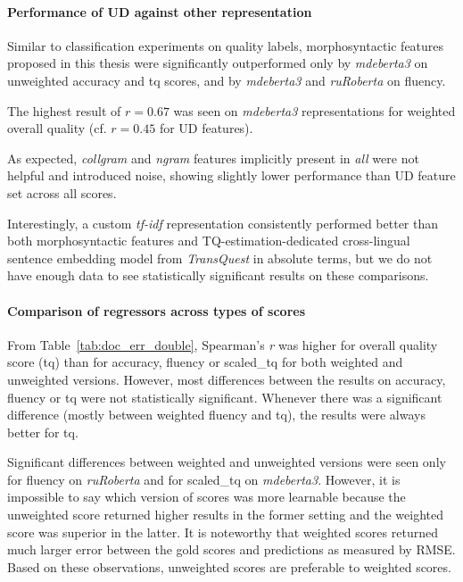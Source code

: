 \paragraph{\label{pg:doc_err_ud_vs_all}Performance of UD against other representation}
Similar to classification experiments on quality labels, morphosyntactic features proposed in this thesis were significantly outperformed only by \textit{mdeberta3} on unweighted accuracy and tq scores, and by \textit{mdeberta3} and \textit{ruRoberta} on fluency.

The highest result of $r=0.67$ was seen on \textit{mdeberta3} representations for weighted overall quality (cf. $r=0.45$ for UD features). %

As expected, \textit{collgram} and \textit{ngram} features implicitly present in \textit{all} were not helpful and introduced noise, showing slightly lower performance than UD feature set across all scores.

Interestingly, a custom \textit{tf-idf} representation consistently performed better than both morphosyntactic features and TQ-estimation-dedicated cross-lingual sentence embedding model from \textit{TransQuest} in absolute terms, but we do not have enough data to see statistically significant results on these comparisons.

\paragraph{Comparison of regressors across types of scores}
From Table~\ref{tab:doc_err_double}, Spearman's \textit{r} was higher for overall quality score (tq) than for accuracy, fluency or scaled\_tq for both weighted and unweighted versions. However, most differences between the results on accuracy, fluency or tq were not statistically significant. Whenever there was a significant difference (mostly between weighted fluency and tq), the results were always better for tq.

Significant differences between weighted and unweighted versions were seen only for fluency on \textit{ruRoberta} and for scaled\_tq on \textit{mdeberta3}. However, it is impossible to say which version of scores was more learnable because the unweighted score returned higher results in the former setting and the weighted score was superior in the latter. 
It is noteworthy that weighted scores returned much larger error between the gold scores and predictions as measured by \gls{RMSE}. 
Based on these observations, {unweighted scores are preferable to weighted scores}.

